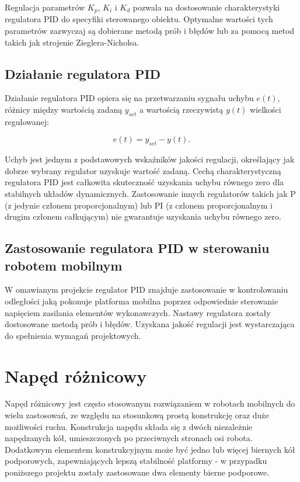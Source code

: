 Regulacja parametrów $K_p$, $K_i$ i $K_d$ pozwala na dostosowanie charakterystyki regulatora PID do specyfiki sterowanego obiektu. Optymalne wartości tych parametrów zazwyczaj są dobierane metodą prób i błędów lub za pomocą metod takich jak strojenie Zieglera-Nicholsa.

\subsection{Działanie regulatora PID}

Działanie regulatora PID opiera się na przetwarzaniu sygnału uchybu $e(t)$, różnicy między wartością zadaną $y_{set}$ a wartością rzeczywistą $y(t)$ wielkości regulowanej:

\begin{equation}
e(t) = y_{set} - y(t) .
\end{equation}

Uchyb jest jednym z podstawowych wskaźników jakości regulacji, określający jak dobrze wybrany regulator uzyskuje wartość zadaną. Cechą charakterystyczną regulatora PID jest całkowita skuteczność uzyskania uchybu równego zero dla stabilnych układów dynamicznych. Zastosowanie innych regulatorów takich jak P (z jedynie członem proporcjonalnym) lub PI (z członem proporcjonalnym i drugim 
członem całkującym) nie gwarantuje uzyskania uchybu równego zero. 


\subsection{Zastosowanie regulatora PID w sterowaniu robotem mobilnym}

W omawianym projekcie regulator PID znajduje zastosowanie w kontrolowaniu odległości jaką pokonuje platforma mobilna poprzez odpowiednie sterowanie napięciem zasilania elementów wykonawczych. Nastawy regulatora zostały dostosowane metodą prób i błędów. Uzyskana jakość regulacji jest wystarczająca do spełnienia wymagań projektowych. 

\section{Napęd różnicowy}

Napęd różnicowy jest często stosowanym rozwiązaniem w robotach mobilnych do wielu zastosowań, ze względu na stosunkową prostą konstrukcję oraz duże możliwości ruchu.  Konstrukcja napędu składa się z dwóch niezależnie napędzanych kół, umieszczonych po przeciwnych stronach osi robota. Dodatkowym elementem konstrukcyjnym może być jedno lub więcej biernych kół podporowych, zapewniających lepszą stabilność platformy - w przypadku poniższego projektu zostały zastosowane dwa elementy bierne podporowe. 

